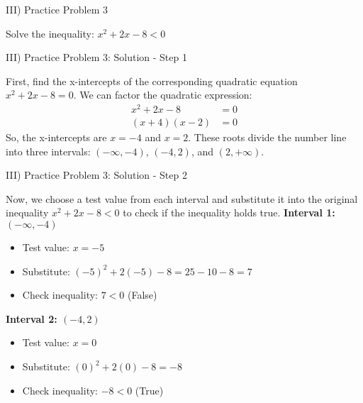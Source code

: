 \documentclass[aspectratio=169]{beamer}
\begin{document}
\begin{frame}{III) Practice Problem 3}
    \begin{tcolorbox}[colback=lightgray,colframe=primary,title=Problem]
        \footnotesize
        Solve the inequality: $x^2 + 2x - 8 < 0$
    \end{tcolorbox}
\end{frame}

\begin{frame}{III) Practice Problem 3: Solution - Step 1}
    \begin{tcolorbox}[colback=lightgray,colframe=accent,title=Solution: Step 1 - Find X-intercepts]
        \footnotesize
        First, find the x-intercepts of the corresponding quadratic equation $x^2 + 2x - 8 = 0$.
        We can factor the quadratic expression:
        \begin{align*}
            x^2 + 2x - 8 &= 0 \\
            (x+4)(x-2) &= 0
        \end{align*}
        So, the x-intercepts are $x=-4$ and $x=2$.
        These roots divide the number line into three intervals: $(-\infty, -4)$, $(-4, 2)$, and $(2, +\infty)$.
    \end{tcolorbox}
\end{frame}

\begin{frame}{III) Practice Problem 3: Solution - Step 2}
    \begin{tcolorbox}[colback=lightgray,colframe=accent,title=Solution: Step 2 - Use Test Values]
        \footnotesize
        Now, we choose a test value from each interval and substitute it into the original inequality $x^2 + 2x - 8 < 0$ to check if the inequality holds true.
        \newline
        \textbf{Interval 1: $(-\infty, -4)$}
        \begin{itemize}
            \item Test value: $x=-5$
            \item Substitute: $(-5)^2 + 2(-5) - 8 = 25 - 10 - 8 = 7$
            \item Check inequality: $7 < 0$ (False)
        \end{itemize}
        \newline
        \textbf{Interval 2: $(-4, 2)$}
        \begin{itemize}
            \item Test value: $x=0$
            \item Substitute: $(0)^2 + 2(0) - 8 = -8$
            \item Check inequality: $-8 < 0$ (True)
        \end{itemize}
    \end{tcolorbox}
\end{frame}
\end{document}
